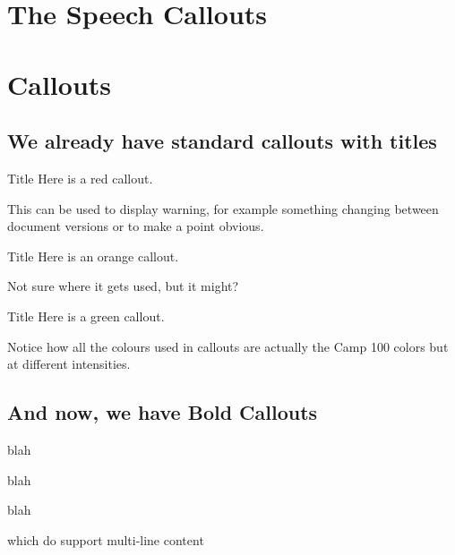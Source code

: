 \documentclass[a4paper, 11pt]{report}
\begin{document}
\makedocumenttitlepage

\chapter{The Speech Callouts}

\chapter{Callouts}
\section{We already have standard callouts with titles}
\begin{callout-red}{Title}
Here is a red callout.

This can be used to display warning, for example something changing between document versions or to make a point obvious.
\end{callout-red}

\begin{callout-orange}{Title}
Here is an orange callout.

Not sure where it gets used, but it might?
\end{callout-orange}

\begin{callout-green}{Title}
Here is a green callout.

Notice how all the colours used in callouts are actually the Camp 100 colors but at different intensities. 
\end{callout-green}

\section{And now, we have Bold Callouts}


\begin{callout-bold-red}
blah
\end{callout-bold-red}

\begin{callout-bold-orange}
blah
\end{callout-bold-orange}

\begin{callout-bold-green}
blah

which do support multi-line content
\end{callout-bold-green}

  

\makedocumentbackpage
\end{document}
